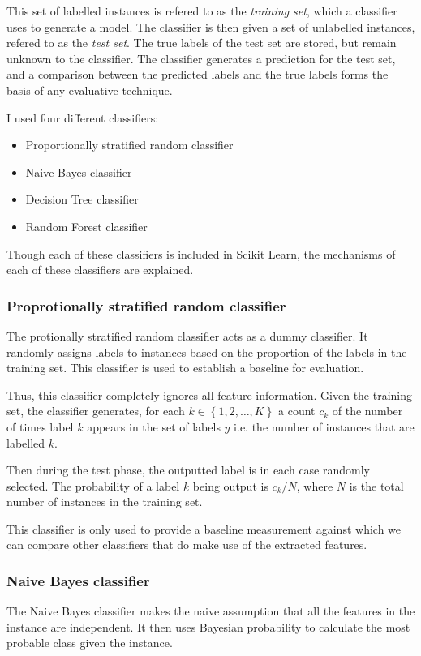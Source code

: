       This set of labelled instances is refered to as the \emph{training set}, which a classifier uses to generate a model. The classifier is then given a set of unlabelled instances, refered to as the \emph{test set}. The true labels of the test set are stored, but remain unknown to the classifier. The classifier generates a prediction for the test set, and a comparison between the predicted labels and the true labels forms the basis of any evaluative technique.
      
      I used four different classifiers:
      \begin{itemize}
        \item Proportionally stratified random classifier
        \item Naive Bayes classifier
        \item Decision Tree classifier
        \item Random Forest classifier
      \end{itemize}
      
      Though each of these classifiers is included in Scikit Learn, the mechanisms of each of these classifiers are explained.
      
      \subsubsection{Proprotionally stratified random classifier}
        The protionally stratified random classifier acts as a dummy classifier. It randomly assigns labels to instances based on the proportion of the labels in the training set. This classifier is used to establish a baseline for evaluation.
        
        Thus, this classifier completely ignores all feature information. Given the training set, the classifier generates, for each $k \in \left\{1, 2, \dots, K\right\}$  a count $c_k$ of the number of times label $k$ appears in the set of labels $y$ i.e. the number of instances that are labelled $k$.
        
        Then during the test phase, the outputted label is in each case randomly selected. The probability of a label $k$ being output is $c_k / N$, where $N$ is the total number of instances in the training set.
        
        This classifier is only used to provide a baseline measurement against which we can compare other classifiers that do make use of the extracted features.
        
      \subsubsection{Naive Bayes classifier}
        The Naive Bayes classifier makes the naive assumption that all the features in the instance are independent. It then uses Bayesian probability to calculate the most probable class given the instance. 
        
